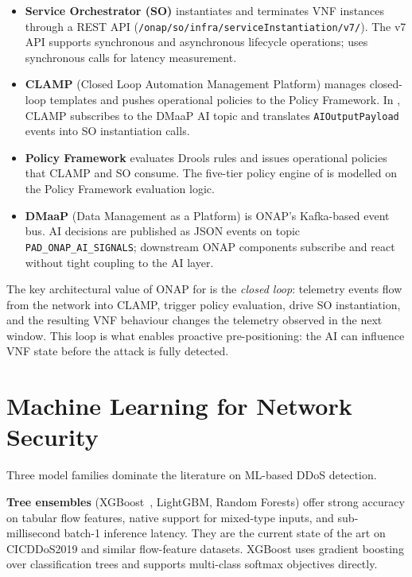 \begin{itemize}
  \item \textbf{Service Orchestrator (SO)} instantiates and terminates VNF
        instances through a REST API
        (\texttt{/onap/so/infra/serviceInstantiation/v7/}).
        The v7 API supports synchronous and asynchronous lifecycle
        operations; \padonap{} uses synchronous calls for latency
        measurement.

  \item \textbf{CLAMP} (Closed Loop Automation Management Platform)
        manages closed-loop templates and pushes operational policies to
        the Policy Framework. In \padonap{}, CLAMP subscribes to the DMaaP
        AI topic and translates \texttt{AIOutputPayload} events into SO
        instantiation calls.

  \item \textbf{Policy Framework} evaluates Drools rules and issues
        operational policies that CLAMP and SO consume. The five-tier
        policy engine of \padonap{} is modelled on the Policy Framework
        evaluation logic.

  \item \textbf{DMaaP} (Data Management as a Platform) is ONAP's
        Kafka-based event bus. AI decisions are published as JSON events
        on topic \texttt{PAD\_ONAP\_AI\_SIGNALS}; downstream ONAP
        components subscribe and react without tight coupling to the AI
        layer.
\end{itemize}

The key architectural value of ONAP for \padonap{} is the \emph{closed
loop}: telemetry events flow from the network into CLAMP, trigger policy
evaluation, drive SO instantiation, and the resulting VNF behaviour
changes the telemetry observed in the next window. This loop is what
enables proactive pre-positioning: the AI can influence VNF state before
the attack is fully detected.

\section{Machine Learning for Network Security}
\label{sec:ml-bg}

Three model families dominate the literature on ML-based DDoS detection.

\textbf{Tree ensembles} (XGBoost~\citep{chen2016xgboost}, LightGBM,
Random Forests) offer strong accuracy on tabular flow features, native
support for mixed-type inputs, and sub-millisecond batch-1 inference
latency. They are the current state of the art on CICDDoS2019 and
similar flow-feature datasets. XGBoost uses gradient boosting over
classification trees and supports multi-class softmax objectives
directly.

